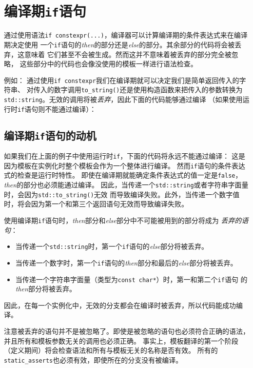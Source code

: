 \chapter{编译期\texttt{if}语句}\label{ch10}
通过使用语法\texttt{if constexpr(...)}，编译器可以计算编译期的条件表达式来在编译期决定使用
一个\texttt{if}语句的\emph{then}的部分还是\emph{else}的部分。其余部分的代码将会被丢弃，这意味着
它们甚至不会被生成。然而这并不意味着被丢弃的部分完全被忽略，
这些部分中的代码也会像没使用的模板一样进行语法检查。

例如：
通过使用\texttt{if constexpr}我们在编译期就可以决定我们是简单返回传入的字符串、
对传入的数字调用\texttt{to\_string()}还是使用构造函数来把传入的参数转换为
\texttt{std::string}。无效的调用将被\emph{丢弃}，因此下面的代码能够通过编译
（如果使用运行时\texttt{if}语句则不能通过编译）：

\section{编译期\texttt{if}语句的动机}
如果我们在上面的例子中使用运行时\texttt{if}，下面的代码将永远不能通过编译：
这是因为模板在实例化时整个模板会作为一个整体进行编译。
然而\texttt{if}语句的条件表达式的检查是运行时特性。
即使在编译期就能确定条件表达式的值一定是\texttt{false}，\emph{then}的部分也必须能通过编译。
因此，当传递一个\texttt{std::string}或者字符串字面量时，会因为\texttt{std::to\_string()}无效
而导致编译失败。此外，当传递一个数字值时，将会因为第一个和第三个返回语句无效而导致编译失败。

使用编译期\texttt{if}语句时，\emph{then}部分和\emph{else}部分中不可能被用到的部分将成为
\emph{丢弃的语句}：
\begin{itemize}
    \item 当传递一个\texttt{std::string}时，第一个\texttt{if}语句的\emph{else}部分将被丢弃。
    \item 当传递一个数字时，第一个\texttt{if}语句的\emph{then}部分和最后的\emph{else}部分将被丢弃。
    \item 当传递一个字符串字面量（类型为\texttt{const char*}）时，第一和第二个\texttt{if}语句
    的\emph{then}部分将被丢弃。
\end{itemize}
因此，在每一个实例化中，无效的分支都会在编译时被丢弃，所以代码能成功编译。

注意被丢弃的语句并不是被忽略了。即使是被忽略的语句也必须符合正确的语法，
并且所有和模板参数无关的调用也必须正确。
事实上，模板翻译的第一个阶段（定义期间）将会检查语法和所有与模板无关的名称是否有效。
所有的\texttt{static\_asserts}也必须有效，即使所在的分支没有被编译。

